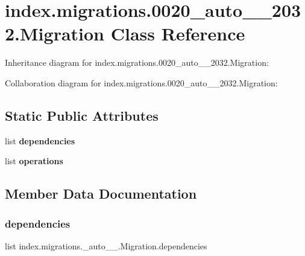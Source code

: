 \hypertarget{classindex_1_1migrations_1_10020__auto__20171025__2032_1_1Migration}{}\section{index.\+migrations.0020\+\_\+auto\+\_\+\_\+2032.Migration Class Reference}
\label{classindex_1_1migrations_1_10020__auto__20171025__2032_1_1Migration}


Inheritance diagram for index.\+migrations.0020\+\_\+auto\+\_\+\_\+2032.Migration\+:


Collaboration diagram for index.\+migrations.0020\+\_\+auto\+\_\+\_\+2032.Migration\+:
\subsection*{Static Public Attributes}
\begin{DoxyCompactItemize}
\item 
list {\bfseries dependencies}
\item 
list {\bfseries operations}
\end{DoxyCompactItemize}


\subsection{Member Data Documentation}
\mbox{\label{classindex_1_1migrations_1_10020__auto__20171025__2032_1_1Migration_a62af6bbe3e92131ed8407714fdae48d7}} 
\subsubsection{\texorpdfstring{dependencies}{dependencies}}
{\footnotesize\ttfamily list index.\+migrations.\+\_\+auto\+\_\+\_.\+Migration.\+dependencies\hspace{0.3cm}{\ttfamily [static]}}

